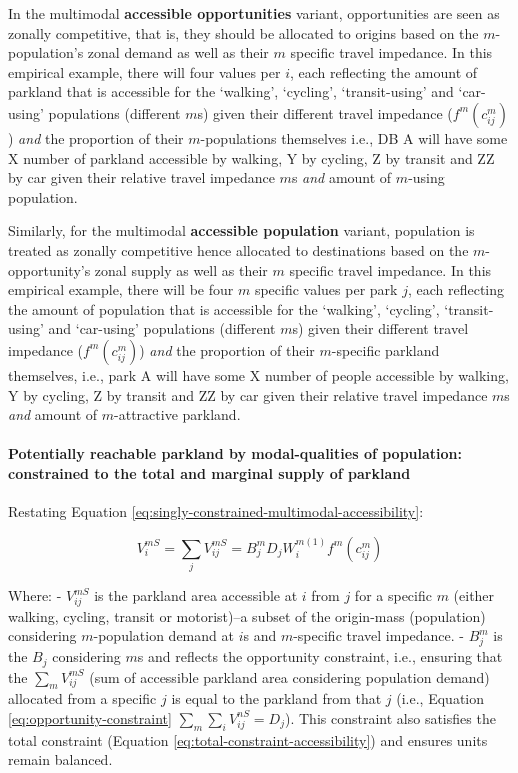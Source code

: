 \documentclass[
11pt, %
oneside, %
english, %
singlespacing, %
]{macthesis} %
\begin{document}
In the multimodal \textbf{accessible opportunities} variant, opportunities are seen as zonally competitive, that is, they should be allocated to origins based on the \(m\)-population's zonal demand as well as their \(m\) specific travel impedance. In this empirical example, there will four values per \(i\), each reflecting the amount of parkland that is accessible for the `walking', `cycling', `transit-using' and `car-using' populations (different \(m\)s) given their different travel impedance (\(f^m(c^m_{ij})\)) \emph{and} the proportion of their \(m\)-populations themselves i.e., DB A will have some X number of parkland accessible by walking, Y by cycling, Z by transit and ZZ by car given their relative travel impedance \(m\)s \emph{and} amount of \(m\)-using population.

Similarly, for the multimodal \textbf{accessible population} variant, population is treated as zonally competitive hence allocated to destinations based on the \(m\)-opportunity's zonal supply as well as their \(m\) specific travel impedance. In this empirical example, there will be four \(m\) specific values per park \(j\), each reflecting the amount of population that is accessible for the `walking', `cycling', `transit-using' and `car-using' populations (different \(m\)s) given their different travel impedance (\(f^m(c^m_{ij})\)) \emph{and} the proportion of their \(m\)-specific parkland themselves, i.e., park A will have some X number of people accessible by walking, Y by cycling, Z by transit and ZZ by car given their relative travel impedance \(m\)s \emph{and} amount of \(m\)-attractive parkland.

\paragraph{Potentially reachable parkland by modal-qualities of population: constrained to the total and marginal supply of parkland}\label{potentially-reachable-parkland-by-modal-qualities-of-population-constrained-to-the-total-and-marginal-supply-of-parkland}

Restating Equation \ref{eq:singly-constrained-multimodal-accessibility}:

\begin{equation}
\label{eq:singly-constrained-multimodal-accessibility}
V^{mS}_{i} = \sum_j V^{mS}_{ij} = B_j^{m} D_j W_i^{m(1)} f^m(c^m_{ij})
\end{equation} 

Where:
- \(V^{mS}_{ij}\) is the parkland area accessible at \(i\) from \(j\) for a specific \(m\) (either walking, cycling, transit or motorist)--a subset of the origin-mass (population) considering \(m\)-population demand at \(i\)s and \(m\)-specific travel impedance.
- \(B_j^{m}\) is the \(B_j\) considering \(m\)s and reflects the opportunity constraint, i.e., ensuring that the \(\sum_m V^{mS}_{ij}\) (sum of accessible parkland area considering population demand) allocated from a specific \(j\) is equal to the parkland from that \(j\) (i.e., Equation \ref{eq:opportunity-constraint} \(\sum_m \sum_i V^{nS}_{ij} =  D_j\)). This constraint also satisfies the total constraint (Equation \ref{eq:total-constraint-accessibility}) and ensures units remain balanced.
\end{document}
